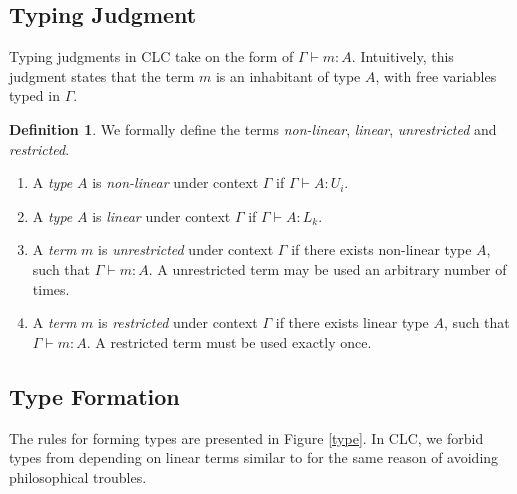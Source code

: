 \documentclass[sigplan,screen,review,authordraft]{acmart}
\theoremstyle{definition}
\newtheorem{definition}{Definition}[section]
\begin{document}
  \subsection{Typing Judgment}
  Typing judgments in CLC take on the form of $\Gamma \vdash m : A$. Intuitively, this judgment states that the term $m$ is an inhabitant of type $A$, with free variables typed in $\Gamma$.

  \begin{definition} We formally define the terms \textit{non-linear}, \textit{linear}, \textit{unrestricted} and \textit{restricted}.
    \begin{enumerate}
      \item A \textit{type} $A$ is \textit{non-linear} under context $\Gamma$ if $\Gamma \vdash A : U_i$.
      \item A \textit{type} $A$ is \textit{linear} under context $\Gamma$ if $\Gamma \vdash A : L_k$.
      \item A \textit{term} $m$ is \textit{unrestricted} under context $\Gamma$ if there exists non-linear type $A$, such that $\Gamma \vdash m : A$. A unrestricted term may be used an arbitrary number of times.
      \item A \textit{term} $m$ is \textit{restricted} under context $\Gamma$ if there exists linear type $A$, such that $\Gamma \vdash m : A$. A restricted term must be used exactly once.
    \end{enumerate}
  \end{definition}

  \subsection{Type Formation} \label{tyformation}
  The rules for forming types are presented in Figure \ref{type}. In CLC, we forbid types from depending on linear terms similar to \cite{llf,neel15} for the same reason of avoiding philosophical troubles.
\end{document}
